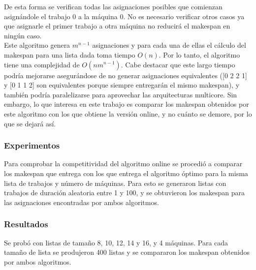 \documentclass[12pt,letterpaper]{article}
\begin{document}
De esta forma se verifican todas las asignaciones posibles que comienzan asignándole el trabajo $0$ a la máquina $0$. No es necesario verificar otros casos ya que asignarle el primer trabajo a otra máquina no reducirá el makespan en ningún caso.\\

Este algoritmo genera $m^{n-1}$ asignaciones y para cada una de ellas el cálculo del makespan para una lista dada toma tiempo $O(n)$. Por lo tanto, el algoritmo tiene una complejidad de $O(nm^{n-1})$. Cabe destacar que este largo tiempo podría mejorarse asegurándose de no generar asignaciones equivalentes ([0 2 2 1] y [0 1 1 2] son equivalentes porque siempre entregarán el mismo makespan), y también podría paralelizarse para aprovechar las arquitecturas multicore. Sin embargo, lo que interesa en este trabajo es comparar los makespan obtenidos por este algoritmo con los que obtiene la versión online, y no cuánto se demore, por lo que se dejará así.

\subsubsection{Experimentos}
	Para comprobar la competitividad del algoritmo online se procedió a comparar los makespan que entrega con los que entrega el algoritmo óptimo para la misma lista de trabajos y número de máquinas. Para esto se generaron listas con trabajos de duración aleatoria entre 1 y 100, y se obtuvieron los makespan para las asignaciones encontradas por ambos algoritmos.

\subsubsection{Resultados}
	Se probó con listas de tamaño 8, 10, 12, 14 y 16, y 4 máquinas. Para cada tamaño de lista se produjeron 400 listas y se compararon los makespan obtenidos por ambos algoritmos.\\
\end{document}
